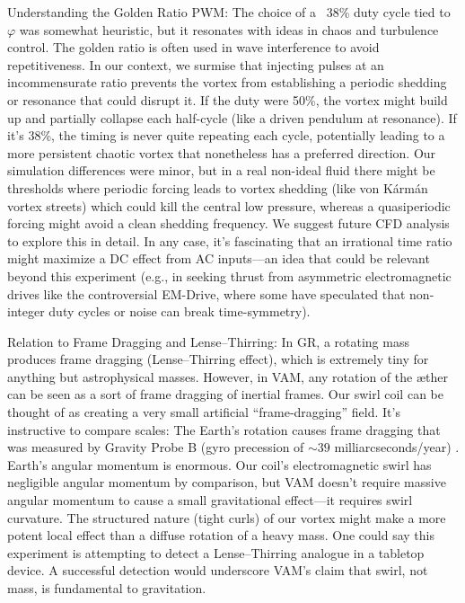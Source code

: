 \documentclass[twocolumn,aps,pre,floatfix,nofootinbib]{revtex4-2}
\begin{document}
Understanding the Golden Ratio PWM: The choice of a ~38\% duty cycle tied to $\varphi$ was somewhat heuristic, but it resonates with ideas in chaos and turbulence control. The golden ratio is often used in wave interference to avoid repetitiveness. In our context, we surmise that injecting pulses at an incommensurate ratio prevents the vortex from establishing a periodic shedding or resonance that could disrupt it. If the duty were 50\%, the vortex might build up and partially collapse each half-cycle (like a driven pendulum at resonance). If it’s 38\%, the timing is never quite repeating each cycle, potentially leading to a more persistent chaotic vortex that nonetheless has a preferred direction. Our simulation differences were minor, but in a real non-ideal fluid there might be thresholds where periodic forcing leads to vortex shedding (like von Kármán vortex streets) which could kill the central low pressure, whereas a quasiperiodic forcing might avoid a clean shedding frequency. We suggest future CFD analysis to explore this in detail. In any case, it’s fascinating that an irrational time ratio might maximize a DC effect from AC inputs—an idea that could be relevant beyond this experiment (e.g., in seeking thrust from asymmetric electromagnetic drives like the controversial EM-Drive, where some have speculated that non-integer duty cycles or noise can break time-symmetry).


Relation to Frame Dragging and Lense–Thirring: In GR, a rotating mass produces frame dragging (Lense–Thirring effect), which is extremely tiny for anything but astrophysical masses. However, in VAM, any rotation of the æther can be seen as a sort of frame dragging of inertial frames. Our swirl coil can be thought of as creating a very small artificial “frame-dragging” field. It’s instructive to compare scales: The Earth’s rotation causes frame dragging that was measured by Gravity Probe B (gyro precession of $\sim 39$ milliarcseconds/year) \cite{Everitt2011}. Earth’s angular momentum is enormous. Our coil’s electromagnetic swirl has negligible angular momentum by comparison, but VAM doesn’t require massive angular momentum to cause a small gravitational effect—it requires swirl curvature. The structured nature (tight curls) of our vortex might make a more potent local effect than a diffuse rotation of a heavy mass. One could say this experiment is attempting to detect a Lense–Thirring analogue in a tabletop device. A successful detection would underscore VAM’s claim that swirl, not mass, is fundamental to gravitation.
\end{document}
